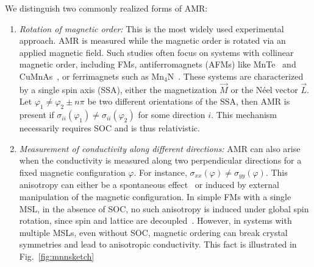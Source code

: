 \documentclass[prb,showpacs,amsmath,amssymb,superscriptaddress,twocolumn,floatfix]{revtex4-1}
\begin{document}
We distinguish two commonly realized forms of AMR:

\begin{enumerate}
	\item \textit{Rotation of magnetic order:} This is the most widely used experimental approach. AMR is measured while the magnetic order is rotated via an applied magnetic field. Such studies often focus on systems with collinear magnetic order, including FMs, antiferromagnets (AFMs) like MnTe~\cite{Kriegner:2017, Gonzalez-Betancourt:2024} and CuMnAs~\cite{Volny:2020, Zubac:2021, Wadley:2016}, or ferrimagnets such as Mn$_4$N~\cite{Kabara:2017}. These systems are characterized by a single spin axis (SSA), either the magnetization $\vec{M}$ or the N\'eel vector $\vec{L}$. Let $\varphi_1 \neq \varphi_2 \pm n\pi$ be two different orientations of the SSA, then AMR is present if $\sigma_{ii}(\varphi_1) \neq \sigma_{ii}(\varphi_2)$ for some direction $i$. This mechanism necessarily requires SOC and is thus relativistic.
	
	\item \textit{Measurement of conductivity along different directions:} AMR can also arise when the conductivity is measured along two perpendicular directions for a fixed magnetic configuration $\varphi$. For instance, $\sigma_{xx}(\varphi) \neq \sigma_{yy}(\varphi)$. This anisotropy can either be a spontaneous effect~\cite{Bakonyi:2022} or induced by external manipulation of the magnetic configuration. In simple FMs with a single MSL, in the absence of SOC, no such anisotropy is induced under global spin rotation, since spin and lattice are decoupled~\cite{Gonzalez-Hernandez:2024}. However, in systems with multiple MSLs, even without SOC, magnetic ordering can break crystal symmetries and lead to anisotropic conductivity. This fact is illustrated in Fig.~\ref{fig:mnnsketch}
\end{enumerate}
\end{document}
